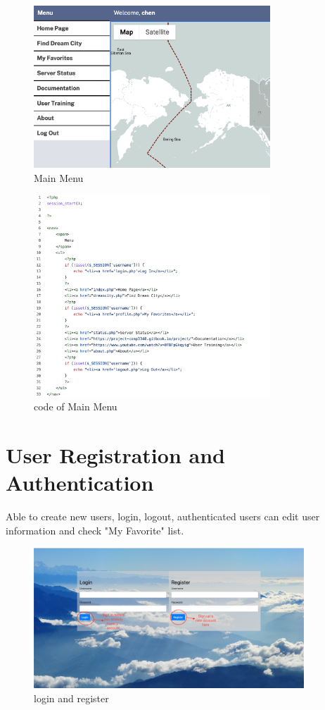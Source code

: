 \documentclass[12pt, letterpaper]{article}
\begin{document}
\begin{figure}[htbp]
	\centering
	\includegraphics[width=3.5in]{images/q4.png}
	\caption{Main Menu}
 \end{figure}
 
 \begin{figure}[htbp]
	\centering
	\includegraphics[width=3.5in]{images/q4_2.png}
	\caption{code of Main Menu}
 \end{figure}

 \newpage

\section{User Registration and Authentication}
Able to create new users, login, logout, authenticated users can edit user information and check "My Favorite" list.

\begin{figure}[htbp]
	\centering
	\includegraphics[width=4in]{images/q5_1.png}
	\caption{login and register}
 \end{figure}
\end{document}
